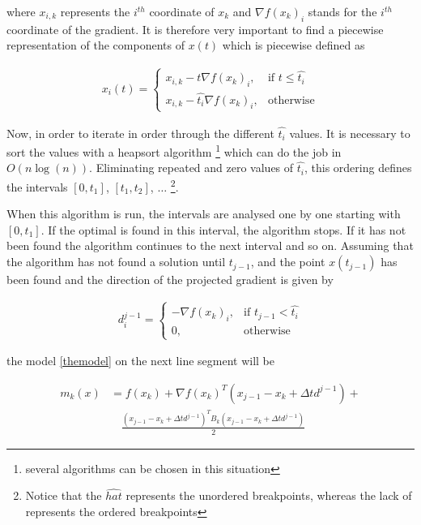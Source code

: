 where $x_{i,k}$ represents the $i^{th}$ coordinate of $x_k$ and $\nabla f(x_k)_i$ stands for the $i^{th}$ coordinate of the gradient. It is therefore very important to find a piecewise representation of the components of $x(t)$ which is piecewise defined as

\begin{equation}
  \begin{aligned}
    x_i(t) = 
    \begin{cases}
      x_{i,k} - t \nabla f(x_k)_i, & \text{if } t \leq \hat{t_i} \\
      x_{i,k} - \hat{t_i} \nabla f(x_k)_i, & \text{otherwise}
    \end{cases}
  \end{aligned}
\end{equation}

Now, in order to iterate in order through the different $\hat{t_i}$ values. It is necessary to sort the values with a heapsort algorithm \footnote{several algorithms can be chosen in this situation} which can do the job in $O(n \log{(n)})$. Eliminating repeated and zero values of $\hat{t_i}$, this ordering defines the intervals $[0, t_1]$, $[t_1, t_2]$, $\ldots$ \footnote{Notice that the $\hat{hat}$ represents the unordered breakpoints, whereas the lack of represents the ordered breakpoints}.

When this algorithm is run, the intervals are analysed one by one starting with $[0, t_1]$. If the optimal is found in this interval, the algorithm stops. If it has not been found the algorithm continues to the next interval and so on. Assuming that the algorithm has not found a solution until $t_{j-1}$, and the point $x(t_{j-1})$ has been found and the direction of the projected gradient is given by

\begin{equation}
  \begin{aligned}
    d_i^{j-1} = 
    \begin{cases}
      -\nabla f(x_k)_i, & \text{if } t_{j-1} < \hat{t_i} \\
      0, & \text{otherwise}
    \end{cases}
  \end{aligned}
\end{equation}

the model \ref{themodel} on the next line segment will be

\begin{equation} \label{modelonpath}
  \begin{aligned}
    m_k(x) & = f(x_k) + \nabla f(x_k)^T ( x_{j-1} - x_k + \Delta t d^{j-1}) + \\
     & \quad \frac{( x_{j-1} - x_k + \Delta t d^{j-1})^T B_k ( x_{j-1} - x_k + \Delta t d^{j-1})}{2}
  \end{aligned}
\end{equation}

